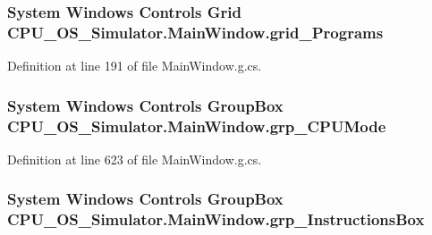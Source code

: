 \subsubsection[{grid\+\_\+\+Programs}]{\setlength{\rightskip}{0pt plus 5cm}System Windows Controls Grid C\+P\+U\+\_\+\+O\+S\+\_\+\+Simulator.\+Main\+Window.\+grid\+\_\+\+Programs\hspace{0.3cm}{\ttfamily [package]}}\label{class_c_p_u___o_s___simulator_1_1_main_window_a7a4cb93db4cde3b227cbc3155af574d2}


Definition at line 191 of file Main\+Window.\+g.\+cs.

\hypertarget{class_c_p_u___o_s___simulator_1_1_main_window_a0e549bad0f6778b2ea3fffb6c2d1a2bb}{}
\subsubsection[{grp\+\_\+\+C\+P\+U\+Mode}]{\setlength{\rightskip}{0pt plus 5cm}System Windows Controls Group\+Box C\+P\+U\+\_\+\+O\+S\+\_\+\+Simulator.\+Main\+Window.\+grp\+\_\+\+C\+P\+U\+Mode\hspace{0.3cm}{\ttfamily [package]}}\label{class_c_p_u___o_s___simulator_1_1_main_window_a0e549bad0f6778b2ea3fffb6c2d1a2bb}


Definition at line 623 of file Main\+Window.\+g.\+cs.

\hypertarget{class_c_p_u___o_s___simulator_1_1_main_window_aebc1256b654d001b7c4ce2bc08522667}{}
\subsubsection[{grp\+\_\+\+Instructions\+Box}]{\setlength{\rightskip}{0pt plus 5cm}System Windows Controls Group\+Box C\+P\+U\+\_\+\+O\+S\+\_\+\+Simulator.\+Main\+Window.\+grp\+\_\+\+Instructions\+Box\hspace{0.3cm}{\ttfamily [package]}}\label{class_c_p_u___o_s___simulator_1_1_main_window_aebc1256b654d001b7c4ce2bc08522667}


